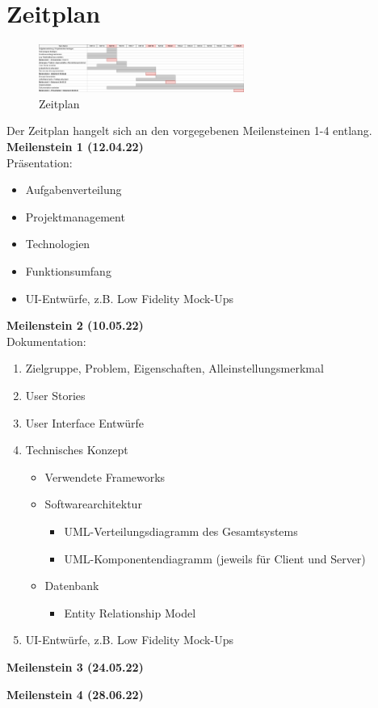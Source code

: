 \chapter*{Zeitplan}


\begin{figure}
    \centering
    \includegraphics[width=0.6\textwidth]{Zeitplan_DeskPlanner.png}
    \caption{Zeitplan}
    \label{fig:Zeitplan}
\end{figure}

Der Zeitplan hangelt sich an den vorgegebenen Meilensteinen 1-4 entlang.\\
\textbf{Meilenstein 1 (12.04.22)}\\
Präsentation:
\begin{itemize}
    \item Aufgabenverteilung
    \item Projektmanagement
    \item Technologien
    \item Funktionsumfang
    \item UI-Entwürfe, z.B. Low Fidelity Mock-Ups
\end{itemize}

\vspace{0.03\textwidth}
\textbf{Meilenstein 2 (10.05.22)} \\
Dokumentation:
\begin{enumerate}
    \item Zielgruppe, Problem, Eigenschaften, Alleinstellungsmerkmal
    \item User Stories
    \item User Interface Entwürfe
    \item Technisches Konzept
    \begin{itemize}
        \item Verwendete Frameworks
        \item Softwarearchitektur
        \begin{itemize}
            \item UML-Verteilungsdiagramm des Gesamtsystems
            \item UML-Komponentendiagramm (jeweils für Client und Server)
        \end{itemize}
        \item Datenbank
        \begin{itemize}
            \item Entity Relationship Model
        \end{itemize}
    \end{itemize}
    \item UI-Entwürfe, z.B. Low Fidelity Mock-Ups
\end{enumerate}

\textbf{Meilenstein 3 (24.05.22)}

\textbf{Meilenstein 4 (28.06.22)}